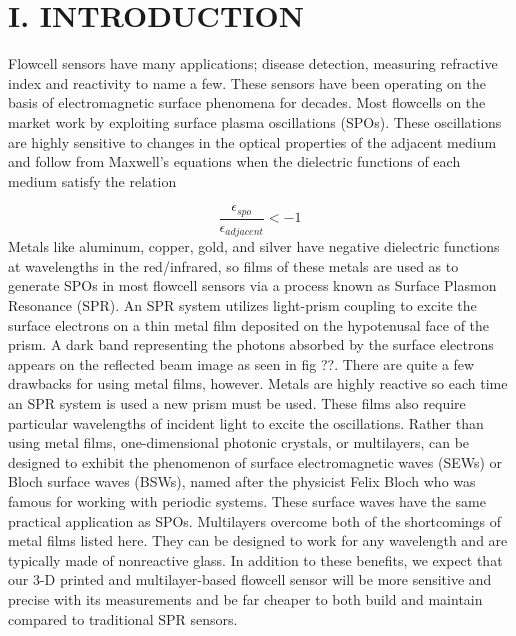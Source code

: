 \selectfont
{}
\section*{I. INTRODUCTION}
\begin{flushleft}
	\hspace{0.25in}
	Flowcell sensors have many applications; disease detection, measuring refractive index and reactivity to name a few. These sensors have been operating on the basis of electromagnetic surface phenomena for decades. Most flowcells on the market work by exploiting surface plasma oscillations (SPOs). These oscillations are highly sensitive to changes in the optical properties of the adjacent medium and follow from Maxwell's equations when the dielectric functions of each medium satisfy the relation \cite{JLTROB:1}
	
	\[
    	\frac{\epsilon_{spo}}{\epsilon_{adjacent}} < -1
	\]
	\hspace{0.25in}
	Metals like aluminum, copper, gold, and silver have negative dielectric functions at wavelengths in the red/infrared, so films of these metals are used as to generate SPOs in most flowcell sensors via a process known as Surface Plasmon Resonance (SPR). An SPR system utilizes light-prism coupling to excite the surface electrons on a thin metal film deposited on the hypotenusal face of the prism. A dark band representing the photons absorbed by the surface electrons appears on the reflected beam image as seen in fig ??. There are quite a few drawbacks for using metal films, however. Metals are highly reactive so each time an SPR system is used a new prism must be used. These films also require particular wavelengths of incident light to excite the oscillations. Rather than using metal films, one-dimensional photonic crystals, or multilayers, can be designed to exhibit the phenomenon of surface electromagnetic waves (SEWs) or Bloch surface waves (BSWs), named after the physicist Felix Bloch who was famous for working with periodic systems. These surface waves have the same practical application as SPOs. Multilayers overcome both of the shortcomings of metal films listed here. They can be designed to work for any wavelength and are typically made of nonreactive glass. In addition to these benefits, we expect that our 3-D printed and multilayer-based flowcell sensor will be more sensitive and precise with its measurements and be far cheaper to both build and maintain compared to traditional SPR sensors.


\end{flushleft}
